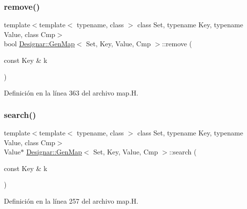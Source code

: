 \subsubsection{\texorpdfstring{remove()}{remove()}}
{\footnotesize\ttfamily template$<$template$<$ typename, class $>$ class Set, typename Key, typename Value, class Cmp$>$ \\
bool \hyperlink{class_designar_1_1_gen_map}{Designar\+::\+Gen\+Map}$<$ Set, Key, Value, Cmp $>$\+::remove (\begin{DoxyParamCaption}\item[{const Key \&}]{k }\end{DoxyParamCaption})\hspace{0.3cm}{\ttfamily [inline]}}



Definición en la línea 363 del archivo map.\+H.

\mbox{\label{class_designar_1_1_gen_map_a6a0eb4fe87d7bcc739f6394d5fd8952e}} 
\subsubsection{\texorpdfstring{search()}{search()}\hspace{0.1cm}{\footnotesize\ttfamily [1/4]}}
{\footnotesize\ttfamily template$<$template$<$ typename, class $>$ class Set, typename Key, typename Value, class Cmp$>$ \\
Value$\ast$ \hyperlink{class_designar_1_1_gen_map}{Designar\+::\+Gen\+Map}$<$ Set, Key, Value, Cmp $>$\+::search (\begin{DoxyParamCaption}\item[{const Key \&}]{k }\end{DoxyParamCaption})\hspace{0.3cm}{\ttfamily [inline]}}



Definición en la línea 257 del archivo map.\+H.

\mbox{\label{class_designar_1_1_gen_map_a1c3b2c788cc8c1a7b59e5afb66fffca4}} 
